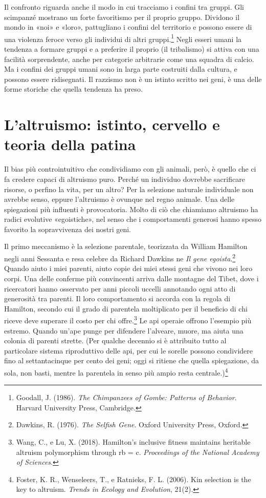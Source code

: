 Il confronto riguarda anche il modo in cui tracciamo i confini tra gruppi. Gli scimpanzé mostrano un forte favoritismo per il proprio gruppo. Dividono il mondo in «noi» e «loro», pattugliano i confini del territorio e possono essere di una violenza feroce verso gli individui di altri gruppi.\footnote{Goodall, J. (1986). \textit{The Chimpanzees of Gombe: Patterns of Behavior}. Harvard University Press, Cambridge.} Negli esseri umani la tendenza a formare gruppi e a preferire il proprio (il tribalismo) si attiva con una facilità sorprendente, anche per categorie arbitrarie come una squadra di calcio. Ma i confini dei gruppi umani sono in larga parte costruiti dalla cultura, e possono essere ridisegnati. Il razzismo non è un istinto scritto nei geni, è una delle forme storiche che quella tendenza ha preso.

\section{L'altruismo: istinto, cervello e teoria della patina}

Il bias più controintuitivo che condividiamo con gli animali, però, è quello che ci fa credere capaci di altruismo puro. Perché un individuo dovrebbe sacrificare risorse, o perfino la vita, per un altro? Per la selezione naturale individuale non avrebbe senso, eppure l'altruismo è ovunque nel regno animale. Una delle spiegazioni più influenti è provocatoria. Molto di ciò che chiamiamo altruismo ha radici evolutive «egoistiche», nel senso che i comportamenti generosi hanno spesso favorito la sopravvivenza dei nostri geni.

Il primo meccanismo è la selezione parentale, teorizzata da William Hamilton negli anni Sessanta e resa celebre da Richard Dawkins ne \textit{Il gene egoista}.\footnote{Dawkins, R. (1976). \textit{The Selfish Gene}. Oxford University Press, Oxford.} Quando aiuto i miei parenti, aiuto copie dei miei stessi geni che vivono nei loro corpi. Una delle conferme più convincenti arriva dalle montagne del Tibet, dove i ricercatori hanno osservato per anni piccoli uccelli annotando ogni atto di generosità tra parenti. Il loro comportamento si accorda con la regola di Hamilton, secondo cui il grado di parentela moltiplicato per il beneficio di chi riceve deve superare il costo per chi offre.\footnote{Wang, C., e Lu, X. (2018). Hamilton's inclusive fitness maintains heritable altruism polymorphism through rb = c. \textit{Proceedings of the National Academy of Sciences}.} Le api operaie offrono l'esempio più estremo. Quando un'ape punge per difendere l'alveare, muore, ma aiuta una colonia di parenti strette. (Per qualche decennio si è attribuito tutto al particolare sistema riproduttivo delle api, per cui le sorelle possono condividere fino al settantacinque per cento dei geni; oggi si ritiene che quella spiegazione, da sola, non basti, mentre la parentela in senso più ampio resta centrale.)\footnote{Foster, K. R., Wenseleers, T., e Ratnieks, F. L. (2006). Kin selection is the key to altruism. \textit{Trends in Ecology and Evolution}, 21(2).}

